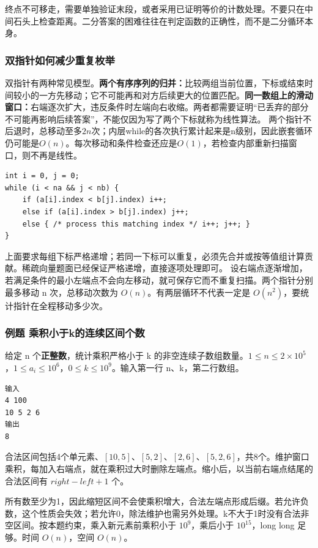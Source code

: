 终点不可移走，需要单独验证末段，或者采用已证明等价的计数处理。不要只在中间石头上检查距离。二分答案的困难往往在判定函数的正确性，而不是二分循环本身。

\subsubsection{双指针如何减少重复枚举}
双指针有两种常见模型。\textbf{两个有序序列的归并：}比较两组当前位置，下标或结束时间较小的一方先移动；它不可能再和对方后续更大的位置匹配。\textbf{同一数组上的滑动窗口：}右端逐次扩大，违反条件时左端向右收缩。两者都需要证明“已丢弃的部分不可能再影响后续答案”，不能仅因为写了两个下标就称为线性算法。
两个指针不后退时，总移动至多$2n$次；内层while的各次执行累计起来是n级别，因此嵌套循环仍可能是$O(n)$。每次移动和条件检查还应是$O(1)$，若检查内部重新扫描窗口，则不再是线性。
\begin{lstlisting}
int i = 0, j = 0;
while (i < na && j < nb) {
    if (a[i].index < b[j].index) i++;
    else if (a[i].index > b[j].index) j++;
    else { /* process this matching index */ i++; j++; }
}
\end{lstlisting}
上面要求每组下标严格递增；若同一下标可以重复，必须先合并或按等值组计算贡献。稀疏向量题面已经保证严格递增，直接逐项处理即可。
设右端点逐渐增加，若满足条件的最小左端点不会向左移动，就可保存它而不重复扫描。两个指针分别最多移动 n 次，总移动次数为 $O(n)$。有两层循环不代表一定是 $O(n^2)$，要统计指针在全程移动多少次。

\subsubsection{例题 乘积小于k的连续区间个数}
给定 n 个\textbf{正整数}，统计乘积严格小于 k 的非空连续子数组数量。$1\le n\le2\times10^5$，$1\le a_i\le10^6$，$0\le k\le10^9$。输入第一行 n、k，第二行数组。
\begin{verbatim}
输入
4 100
10 5 2 6
输出
8
\end{verbatim}
合法区间包括4个单元素、$[10,5]$、$[5,2]$、$[2,6]$、$[5,2,6]$，共8个。维护窗口乘积，每加入右端点，就在乘积过大时删除左端点。缩小后，以当前右端点结尾的合法区间有 $right-left+1$ 个。

所有数至少为1，因此缩短区间不会使乘积增大，合法左端点形成后缀。若允许负数，这个性质会失效；若允许0，除法维护也需另外处理。k不大于1时没有合法非空区间。按本题约束，乘入新元素前乘积小于 $10^9$，乘后小于 $10^{15}$，long long 足够。时间 $O(n)$，空间 $O(n)$。

